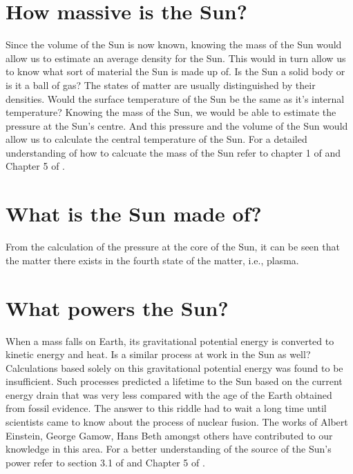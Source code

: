 \documentclass{../template/texnote}
\begin{document}
\section{How massive is the Sun?}
Since the volume of the Sun is now known, knowing the mass of the Sun would allow us to estimate an average density for the Sun.
This would in turn allow us to know what sort of material the Sun is made up of.
Is the Sun a solid body or is it a ball of gas?
The states of matter are usually distinguished by their densities.
Would the surface temperature of the Sun be the same as it's internal temperature?
Knowing the mass of the Sun, we would be able to estimate the pressure at the Sun's centre.
And this pressure and the volume of the Sun would allow us to calculate the central temperature of the Sun.
For a detailed understanding of how to calcuate the mass of the Sun refer to chapter 1 of  and Chapter 5 of .

\section{What is the Sun made of?}
From the calculation of the pressure at the core of the Sun, it can be seen that the matter there exists in the fourth state of the matter, i.e., plasma.
\section{What powers the Sun?}
When a mass falls on Earth, its gravitational potential energy is converted to kinetic energy and heat.
Is a similar process at work in the Sun as well?
Calculations based solely on this gravitational potential energy was found to be insufficient.
Such processes predicted a lifetime to the Sun based on the current energy drain that was very less compared with the age of the Earth obtained from fossil evidence.
The answer to this riddle had to wait a long time until scientists came to know about the process of nuclear fusion.
The works of Albert Einstein, George Gamow, Hans Beth amongst others have contributed to our knowledge in this area.
For a better understanding of the source of the Sun's power refer to section 3.1 of  and Chapter 5 of .
\end{document}
